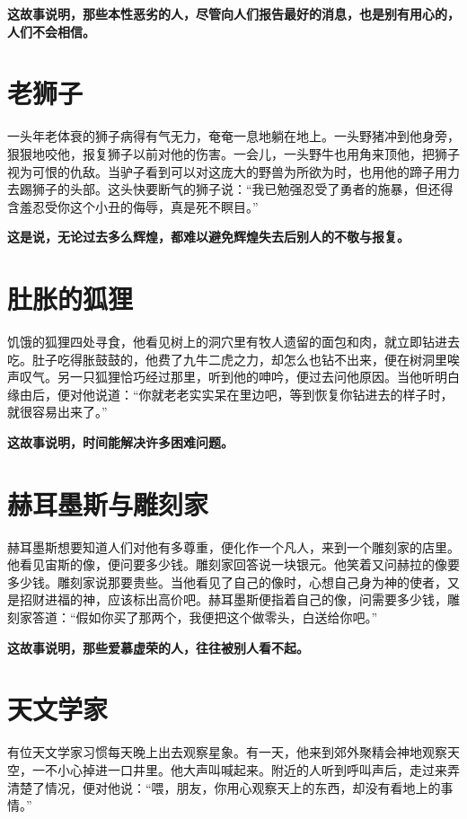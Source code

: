 {\bfseries \color{red}这故事说明，那些本性恶劣的人，尽管向人们报告最好的消息，也是别有用心的，人们不会相信。}

\section{老狮子}

一头年老体衰的狮子病得有气无力，奄奄一息地躺在地上。一头野猪冲到他身旁，狠狠地咬他，报复狮子以前对他的伤害。一会儿，一头野牛也用角来顶他，把狮子视为可恨的仇敌。当驴子看到可以对这庞大的野兽为所欲为时，也用他的蹄子用力去踢狮子的头部。这头快要断气的狮子说：“我已勉强忍受了勇者的施暴，但还得含羞忍受你这个小丑的侮辱，真是死不瞑目。”

{\bfseries \color{red}这是说，无论过去多么辉煌，都难以避免辉煌失去后别人的不敬与报复。}

\section{肚胀的狐狸}

饥饿的狐狸四处寻食，他看见树上的洞穴里有牧人遗留的面包和肉，就立即钻进去吃。肚子吃得胀鼓鼓的，他费了九牛二虎之力，却怎么也钻不出来，便在树洞里唉声叹气。另一只狐狸恰巧经过那里，听到他的呻吟，便过去问他原因。当他听明白缘由后，便对他说道：“你就老老实实呆在里边吧，等到恢复你钻进去的样子时，就很容易出来了。”

{\bfseries \color{red}这故事说明，时间能解决许多困难问题。}

\section{赫耳墨斯与雕刻家}

赫耳墨斯想要知道人们对他有多尊重，便化作一个凡人，来到一个雕刻家的店里。他看见宙斯的像，便问要多少钱。雕刻家回答说一块银元。他笑着又问赫拉的像要多少钱。雕刻家说那要贵些。当他看见了自己的像时，心想自己身为神的使者，又是招财进福的神，应该标出高价吧。赫耳墨斯便指着自己的像，问需要多少钱，雕刻家答道：“假如你买了那两个，我便把这个做零头，白送给你吧。”

{\bfseries \color{red}这故事说明，那些爱慕虚荣的人，往往被别人看不起。}

\section{天文学家}

有位天文学家习惯每天晚上出去观察星象。有一天，他来到郊外聚精会神地观察天空，一不小心掉进一口井里。他大声叫喊起来。附近的人听到呼叫声后，走过来弄清楚了情况，便对他说：“喂，朋友，你用心观察天上的东西，却没有看地上的事情。”

